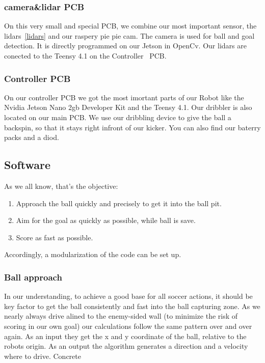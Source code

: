 \documentclass{scrartcl}
\begin{document}
\subsubsection*{camera\&lidar PCB}
On this very small and special PCB, we combine our most important sensor, the lidars~\ref{lidars} and our raspery pie 
pie cam. The camera is used for ball and goal detection. It is directly programmed on our Jetson in OpenCv.
Our lidars are conected to the Teensy 4.1 on the Controller~\label{PCB:Controller} PCB.

\subsubsection{Controller PCB}

On our controller PCB we got the most imortant parts of our Robot like the Nvidia Jetson Nano 2gb Developer Kit
and the Teensy 4.1. Our dribbler is also located on our main PCB. We use our dribbling device
to give the ball a backspin, so that it stays right infront of our kicker. You can also find our baterry packs 
and a diod. 

 \subsection{Software} %
 As we all know, that's the objective:
 \begin{enumerate}
     \item{Approach the ball quickly and precisely to get it into the ball pit.}
     \item{Aim for the goal as quickly as possible, while ball is save.}
     \item{Score as fast as possible.}
 \end{enumerate}
 Accordingly, a modularization of the code can be set up.
 \subsubsection{Ball approach}
 In our understanding, to achieve a good base for all soccer actions, it should be key factor to get the ball 
 consistently and fast into the ball capturing zone.
 As we nearly always drive alined to the enemy-sided wall (to minimize the risk of scoring in our own goal) our 
 calculations follow the same pattern over and over again. As an input they get the x and y coordinate of the 
 ball, relative to the robots origin. As an output the algorithm generates a direction and a velocity where to drive. 
 Concrete
\end{document}
